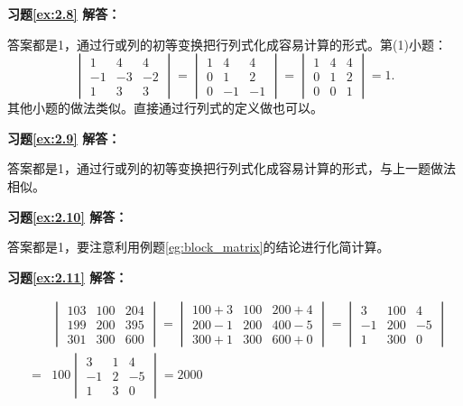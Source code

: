 \vspace{1.5em}

\textbf{习题\ref{ex:2.8} 解答：}

答案都是1，通过行或列的初等变换把行列式化成容易计算的形式。第(1)小题：
$$\begin{vmatrix} 1 & 4 & 4 \\ -1 & -3 & -2 \\ 1 & 3 & 3 \end{vmatrix} = \begin{vmatrix} 1 & 4 & 4 \\ 0 & 1 & 2 \\ 0 & -1 & -1 \end{vmatrix} = \begin{vmatrix} 1 & 4 & 4 \\ 0 & 1 & 2 \\ 0 & 0 & 1 \end{vmatrix} = 1.$$
其他小题的做法类似。直接通过行列式的定义做也可以。

\vspace{1.5em}

\textbf{习题\ref{ex:2.9} 解答：}

答案都是1，通过行或列的初等变换把行列式化成容易计算的形式，与上一题做法相似。

\vspace{1.5em}

\textbf{习题\ref{ex:2.10} 解答：}

答案都是1，要注意利用例题\ref{eg:block_matrix}的结论进行化简计算。

\vspace{1.5em}

\textbf{习题\ref{ex:2.11} 解答：}

\begin{eqnarray*}
& & \begin{vmatrix} 103 & 100 & 204 \\ 199 & 200 & 395 \\ 301 & 300 & 600 \end{vmatrix}
=\begin{vmatrix} 100+3 & 100 & 200+4 \\ 200-1 & 200 & 400-5 \\ 300+1 & 300 & 600+0 \end{vmatrix} = \begin{vmatrix} 3 & 100 & 4 \\ -1 & 200 & -5 \\ 1 & 300 & 0 \end{vmatrix} \\
& = & 100\begin{vmatrix} 3 & 1 & 4 \\ -1 & 2 & -5 \\ 1 & 3 & 0 \end{vmatrix} = 2000
\end{eqnarray*}

